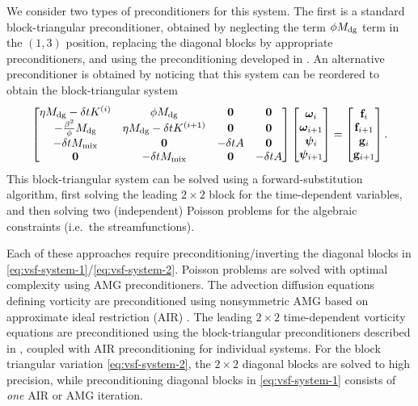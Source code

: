 \documentclass[review]{siamart}
\begin{document}
We consider two types of preconditioners for this system.
The first is a standard block-triangular preconditioner, obtained by neglecting the term $\phi M_{\rm dg}$ term in the $(1,3)$ position, replacing the diagonal blocks by appropriate preconditioners, and using the preconditioning developed in .
An alternative preconditioner is obtained by noticing that this system can be reordered to obtain the block-triangular system
\begin{align} \label{eq:vsf-system-2}
	\begin{bmatrix}
		\eta M_{\rm dg} - \delta t K^{(i)} & \phi M_{\rm dg} & \mathbf{0} & \mathbf{0} \\
		-\tfrac{\beta^2}{\phi}M_{\rm dg} & \eta M_{\rm dg} - \delta t K^{(i+1)}  & \mathbf{0}& \mathbf{0} \\
		-\delta t M_{\rm mix} & \mathbf{0} & -\delta t A & \mathbf{0} \\
		\mathbf{0} & -\delta t M_{\rm mix} & \mathbf{0} & -\delta t A
	\end{bmatrix}
	\begin{bmatrix} \bm\omega_i \\ \bm\omega_{i+1} \\ \bm\psi_i \\ \bm\psi_{i+1} \end{bmatrix}
	=
	\begin{bmatrix} \mathbf{f}_i \\ \mathbf{f}_{i+1} \\ \mathbf{g}_i \\ \mathbf{g}_{i+1} \end{bmatrix}.
\end{align}
This block-triangular system can be solved using a forward-substitution algorithm, first solving the leading $2\times2$ block for the time-dependent variables, and then solving two (independent) Poisson problems for the algebraic constraints (i.e.\ the streamfunctions).

Each of these approaches require preconditioning/inverting the diagonal blocks in
\eqref{eq:vsf-system-1}/\eqref{eq:vsf-system-2}. Poisson problems are solved with optimal complexity using AMG preconditioners. The advection diffusion equations defining vorticity are preconditioned using nonsymmetric AMG based on approximate ideal restriction (AIR) \cite{Manteuffel:2019,Manteuffel:2018}.
The leading $2\times 2$ time-dependent vorticity equations are preconditioned using the block-triangular preconditioners described in , coupled with AIR preconditioning for individual systems.
For the block triangular variation \eqref{eq:vsf-system-2}, the $2\times2$ diagonal blocks are solved to high precision, while preconditioning diagonal blocks in \eqref{eq:vsf-system-1} consists of \textit{one} AIR or AMG iteration.
\end{document}
